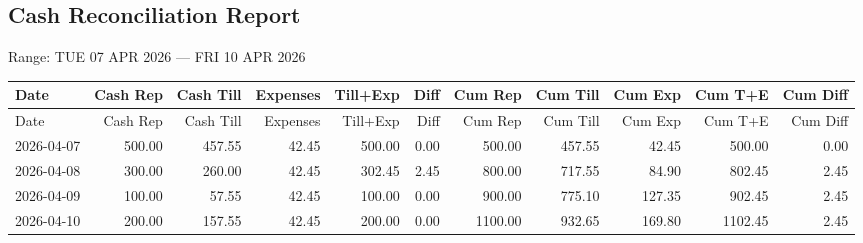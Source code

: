\documentclass[11pt]{article}
\begin{document}
\begin{landscape}

\section*{Cash Reconciliation Report}
\noindent
Range: TUE 07 APR 2026 --- FRI 10 APR 2026

\bigskip

\footnotesize
\setlength{\LTleft}{0pt}
\setlength{\LTright}{0pt}

\begin{longtable}{p{3.2cm} r r r r r r r r r r}
\toprule
Date & Cash Rep & Cash Till & Expenses & Till+Exp & Diff & Cum Rep & Cum Till & Cum Exp & Cum T+E & Cum Diff \\
\midrule
\endfirsthead

\toprule
Date & Cash Rep & Cash Till & Expenses & Till+Exp & Diff & Cum Rep & Cum Till & Cum Exp & Cum T+E & Cum Diff \\
\midrule
\endhead

\bottomrule
\endfoot

2026-04-07 & 500.00 & 457.55 & 42.45 & 500.00 & 0.00 & 500.00 & 457.55 & 42.45 & 500.00 & 0.00 \\
2026-04-08 & 300.00 & 260.00 & 42.45 & 302.45 & 2.45 & 800.00 & 717.55 & 84.90 & 802.45 & 2.45 \\
2026-04-09 & 100.00 & 57.55 & 42.45 & 100.00 & 0.00 & 900.00 & 775.10 & 127.35 & 902.45 & 2.45 \\
2026-04-10 & 200.00 & 157.55 & 42.45 & 200.00 & 0.00 & 1100.00 & 932.65 & 169.80 & 1102.45 & 2.45 \\
\end{longtable}

\end{landscape}
\end{document}
